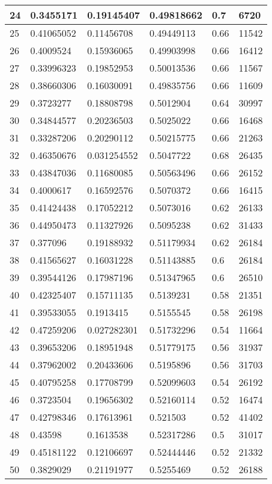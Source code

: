 \begin{longtable}{|l|l|l|l|l|l|}
24 & 0.3455171 & 0.19145407 & 0.49818662 & 0.7 & 6720 \\ \hline 
25 & 0.41065052 & 0.11456708 & 0.49449113 & 0.66 & 11542 \\ \hline 
26 & 0.4009524 & 0.15936065 & 0.49903998 & 0.66 & 16412 \\ \hline 
27 & 0.33996323 & 0.19852953 & 0.50013536 & 0.66 & 11567 \\ \hline 
28 & 0.38660306 & 0.16030091 & 0.49835756 & 0.66 & 11609 \\ \hline 
29 & 0.3723277 & 0.18808798 & 0.5012904 & 0.64 & 30997 \\ \hline 
30 & 0.34844577 & 0.20236503 & 0.5025022 & 0.66 & 16468 \\ \hline 
31 & 0.33287206 & 0.20290112 & 0.50215775 & 0.66 & 21263 \\ \hline 
32 & 0.46350676 & 0.031254552 & 0.5047722 & 0.68 & 26435 \\ \hline 
33 & 0.43847036 & 0.11680085 & 0.50563496 & 0.66 & 26152 \\ \hline 
34 & 0.4000617 & 0.16592576 & 0.5070372 & 0.66 & 16415 \\ \hline 
35 & 0.41424438 & 0.17052212 & 0.5073016 & 0.62 & 26133 \\ \hline 
36 & 0.44950473 & 0.11327926 & 0.5095238 & 0.62 & 31433 \\ \hline 
37 & 0.377096 & 0.19188932 & 0.51179934 & 0.62 & 26184 \\ \hline 
38 & 0.41565627 & 0.16031228 & 0.51143885 & 0.6 & 26184 \\ \hline 
39 & 0.39544126 & 0.17987196 & 0.51347965 & 0.6 & 26510 \\ \hline 
40 & 0.42325407 & 0.15711135 & 0.5139231 & 0.58 & 21351 \\ \hline 
41 & 0.39533055 & 0.1913415 & 0.5155545 & 0.58 & 26198 \\ \hline 
42 & 0.47259206 & 0.027282301 & 0.51732296 & 0.54 & 11664 \\ \hline 
43 & 0.39653206 & 0.18951948 & 0.51779175 & 0.56 & 31937 \\ \hline 
44 & 0.37962002 & 0.20433606 & 0.5195896 & 0.56 & 31703 \\ \hline 
45 & 0.40795258 & 0.17708799 & 0.52099603 & 0.54 & 26192 \\ \hline 
46 & 0.3723504 & 0.19656302 & 0.52160114 & 0.52 & 16474 \\ \hline 
47 & 0.42798346 & 0.17613961 & 0.521503 & 0.52 & 41402 \\ \hline 
48 & 0.43598 & 0.1613538 & 0.52317286 & 0.5 & 31017 \\ \hline 
49 & 0.45181122 & 0.12106697 & 0.52444446 & 0.52 & 21332 \\ \hline 
50 & 0.3829029 & 0.21191977 & 0.5255469 & 0.52 & 26188 \\ \hline 
\end{longtable}